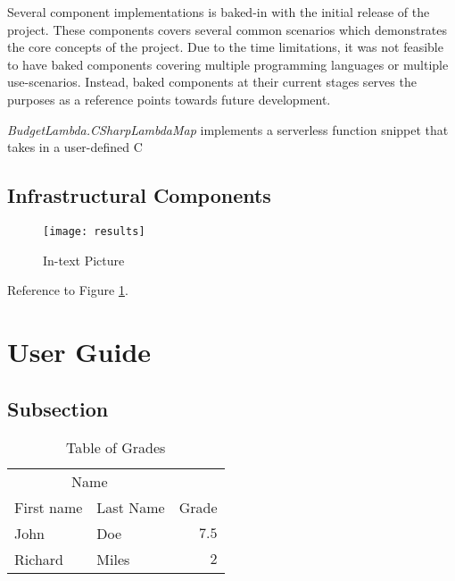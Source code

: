 \documentclass[fleqn,10pt]{SelfArx} %
\newcommand{\CSh}{C\nolinebreak\hspace{-.05em}\raisebox{.6ex}{\tiny\bf \#}}
\begin{document}
Several component implementations is baked-in with the initial release of the project. These components covers several common scenarios which demonstrates the core concepts of the project. Due to the time limitations, it was not feasible to have baked components covering multiple programming languages or multiple use-scenarios. Instead, baked components at their current stages serves the purposes as a reference points towards future development.

\emph{BudgetLambda.CSharpLambdaMap} implements a serverless function snippet that takes in a user-defined \CSh

\subsection{Infrastructural Components}

\lipsum[9] %

\begin{figure}[ht]\centering
	\texttt{[image: results]}
	\caption{In-text Picture}
	\label{fig:results}
\end{figure}

Reference to Figure \ref{fig:results}.


\section{User Guide}

\lipsum[10] %

\subsection{Subsection}

\lipsum[11] %

\begin{table}[hbt]
	\caption{Table of Grades}
	\centering
	\begin{tabular}{llr}
		\toprule
		\multicolumn{2}{c}{Name} \\
		\cmidrule(r){1-2}
		First name & Last Name & Grade \\
		\midrule
		John & Doe & $7.5$ \\
		Richard & Miles & $2$ \\
		\bottomrule
	\end{tabular}
	\label{tab:label}
\end{table}
\end{document}
